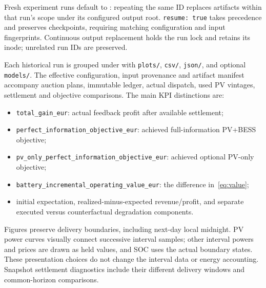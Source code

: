 \documentclass[11pt,a4paper]{article}
\begin{document}
Fresh experiment runs default to
: repeating the same ID
replaces artifacts within that run's scope under its configured output root.
\texttt{resume: true} takes precedence and preserves checkpoints, requiring
matching configuration and input fingerprints. Continuous output replacement
holds the run lock and retains its inode; unrelated run IDs are preserved.

Each historical run is grouped under
 with
\texttt{plots/}, \texttt{csv/}, \texttt{json/}, and optional \texttt{models/}.
The effective configuration, input provenance and artifact manifest accompany
auction plans, immutable ledger, actual dispatch, used PV vintages, settlement
and objective comparisons. The main KPI distinctions are:
\begin{itemize}
\item \texttt{total\_gain\_eur}: actual feedback profit after available settlement;
\item \texttt{perfect\_information\_objective\_eur}: achieved full-information PV+BESS objective;
\item \texttt{pv\_only\_perfect\_information\_objective\_eur}: achieved optional PV-only objective;
\item \texttt{battery\_incremental\_operating\_value\_eur}: the difference in~\eqref{eq:value};
\item initial expectation, realized-minus-expected revenue/profit, and separate executed versus counterfactual degradation components.
\end{itemize}
Figures preserve delivery boundaries, including next-day local midnight. PV
power curves visually connect successive interval samples; other interval powers
and prices are drawn as held values, and SOC uses the actual boundary states.
These presentation choices do not change the interval data or energy accounting.
Snapshot settlement diagnostics
include their different delivery windows and common-horizon comparisons.
\end{document}
